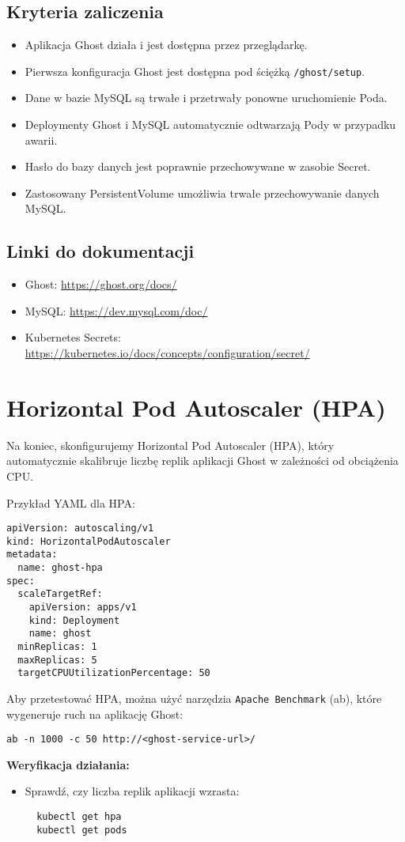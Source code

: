 \documentclass{article}
\begin{document}
\subsection{Kryteria zaliczenia}
\begin{itemize}
  \item Aplikacja Ghost działa i jest dostępna przez przeglądarkę.
  \item Pierwsza konfiguracja Ghost jest dostępna pod ściężką \texttt{/ghost/setup}.
  \item Dane w bazie MySQL są trwałe i przetrwały ponowne uruchomienie Poda.
  \item Deploymenty Ghost i MySQL automatycznie odtwarzają Pody w przypadku awarii.
  \item Hasło do bazy danych jest poprawnie przechowywane w zasobie Secret.
  \item Zastosowany PersistentVolume umożliwia trwałe przechowywanie danych MySQL.
\end{itemize}

\subsection{Linki do dokumentacji}
\begin{itemize}
  \item Ghost: \url{https://ghost.org/docs/}
  \item MySQL: \url{https://dev.mysql.com/doc/}
  \item Kubernetes Secrets: \url{https://kubernetes.io/docs/concepts/configuration/secret/}
\end{itemize}
\section{Horizontal Pod Autoscaler (HPA)}

Na koniec, skonfigurujemy Horizontal Pod Autoscaler (HPA), który automatycznie skalibruje liczbę replik aplikacji Ghost w zależności od obciążenia CPU.

Przykład YAML dla HPA:
\begin{lstlisting}
apiVersion: autoscaling/v1
kind: HorizontalPodAutoscaler
metadata:
  name: ghost-hpa
spec:
  scaleTargetRef:
    apiVersion: apps/v1
    kind: Deployment
    name: ghost
  minReplicas: 1
  maxReplicas: 5
  targetCPUUtilizationPercentage: 50
\end{lstlisting}

Aby przetestować HPA, można użyć narzędzia \texttt{Apache Benchmark} (ab), które wygeneruje ruch na aplikację Ghost:
\begin{lstlisting}
ab -n 1000 -c 50 http://<ghost-service-url>/
\end{lstlisting}

\textbf{Weryfikacja działania:}
\begin{itemize}
  \item Sprawdź, czy liczba replik aplikacji wzrasta:
  \begin{lstlisting}
  kubectl get hpa
  kubectl get pods
  \end{lstlisting}
\end{itemize}
\end{document}
